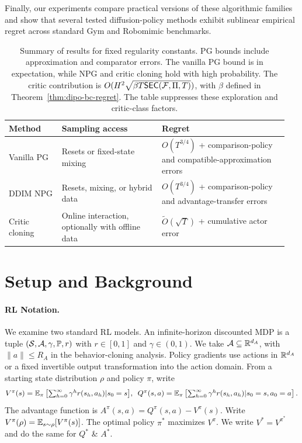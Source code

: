Finally, our experiments compare practical versions of these algorithmic families and show that several tested diffusion-policy methods exhibit sublinear empirical regret across standard Gym and Robomimic benchmarks.


\begin{table}
\centering
\small
\setlength{\tabcolsep}{3pt}
\begin{tabular}{@{}>{\raggedright\arraybackslash}p{0.18\linewidth}>{\raggedright\arraybackslash}p{0.34\linewidth}>{\raggedright\arraybackslash}p{0.43\linewidth}@{}}
\toprule
Method & Sampling access & Regret \\
\midrule
Vanilla PG & Resets or fixed-state mixing & $O(T^{3/4})$ + comparison-policy and compatible-approximation errors \\
DDIM NPG & Resets, mixing, or hybrid data & $O(T^{3/4})$ + comparison-policy and advantage-transfer errors \\
Critic cloning & Online interaction, optionally with offline data & $\widetilde O(\sqrt T)$ + cumulative actor error \\
\bottomrule
\end{tabular}
\vspace{1ex}
\caption[Summary of diffusion-policy learning guarantees]{Summary of results for fixed regularity constants. PG bounds include approximation and comparator errors. The vanilla PG bound is in expectation, while NPG and critic cloning hold with high probability. The critic contribution is $O(H^2\sqrt{\beta T\mathsf{SEC}({\mathcal{F}},\Pi,T)})$, with $\beta$ defined in Theorem~\ref{thm:dipo-bc-regret}. The table suppresses these exploration and critic-class factors.}
\label{tab:cost-map}

\end{table}


\section{Setup and Background}

\paragraph{RL Notation.} We examine two standard RL models. An infinite-horizon discounted MDP is a tuple $({\mathcal{S}}, {\mathcal{A}}, \gamma, {\mathbb{P}}, r)$ with $r \in [0,1]$ and $\gamma \in (0,1)$. We take ${\mathcal{A}} \subseteq {\mathbb{R}}^{d_A}$, with $\|a\|\leq R_A$ in the behavior-cloning analysis. Policy gradients use actions in ${\mathbb{R}}^{d_A}$ or a fixed invertible output transformation into the action domain. 
From a starting state distribution $\rho$ and policy $\pi$, write
$$\textstyle{V^\pi(s) = \mathbb{E}_{\pi} \left[\sum_{h=0}^\infty \gamma^h r(s_h,a_h) | s_0 = s\right]}, \enspace {Q^\pi(s,a) = \mathbb{E}_{\pi} \left[\sum_{h=0}^\infty \gamma^h r(s_h,a_h) | s_0 = s, a_0 = a\right].}$$
The advantage function is \mbox{$A^\pi(s,a) = Q^\pi(s,a) - V^\pi(s)$.} Write $V^\pi(\rho) = \mathbb{E}_{s \sim \rho}[V^\pi(s)]$. The optimal policy $\pi^*$ maximizes $V^\pi$. We write $V^* = V^{\pi^*}$ and do the same for $Q^*$ \& $A^*$.


